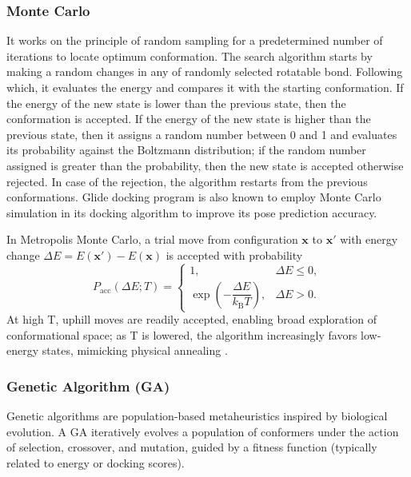 \documentclass[12pt]{article}
\begin{document}
\subsubsection{Monte Carlo} 

It works on the principle of random sampling for a predetermined number of iterations to locate optimum conformation\cite{CH2_Metropolis1953}. The search algorithm starts by making a random changes in any of randomly selected rotatable bond. Following which, it evaluates the energy and compares it with the starting conformation. If the energy of the new state is lower than the previous state, then the conformation is accepted. If the energy of the new state is higher than the previous state, then it assigns a random number between 0 and 1 and evaluates its probability against the Boltzmann distribution; if the random number assigned is greater than the probability, then the new state is accepted otherwise rejected. In case of the rejection, the algorithm restarts from the previous conformations. Glide docking program is also known to employ Monte Carlo simulation in its docking algorithm to improve its pose prediction accuracy.

In Metropolis Monte Carlo\cite{CH2_Metropolis1953}, a trial move from configuration \(\mathbf{x}\) to \(\mathbf{x}'\) with energy change \(\Delta E = E(\mathbf{x}') - E(\mathbf{x})\) is accepted with probability
\begin{equation}
    P_{\mathrm{acc}}(\Delta E;T) =
    \begin{cases}
        1, & \Delta E \le 0, \\
        \exp\!\left(-\dfrac{\Delta E}{k_{\mathrm{B}} T}\right), & \Delta E > 0.
    \end{cases}
\end{equation}
At high T, uphill moves are readily accepted, enabling broad exploration of conformational space; as T is lowered, the algorithm increasingly favors low-energy states, mimicking physical annealing \cite{CH2_Kirkpatrick1983}.

\subsubsection{Genetic Algorithm (GA)} 

Genetic algorithms are population-based metaheuristics inspired by biological evolution.\cite{CH2_Judson1993,CH2_Goodman1998} A GA iteratively evolves a population of conformers under the action of selection, crossover, and mutation, guided by a fitness function (typically related to energy or docking scores).
\end{document}
